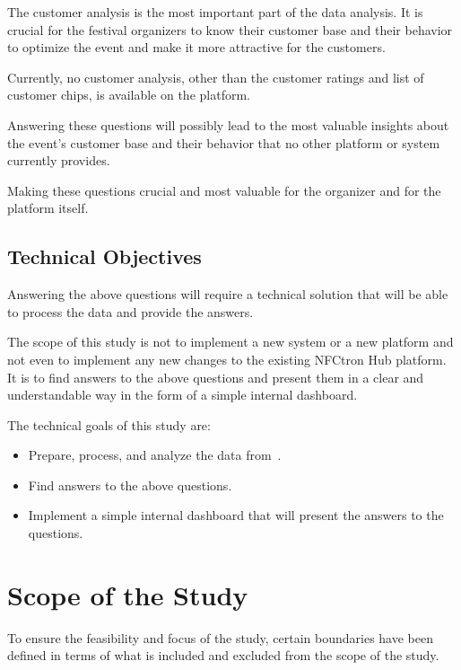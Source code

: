 The customer analysis is the most important part of the data analysis.
It is crucial for the festival organizers to know their customer base and their behavior to optimize the event and make it more attractive for the customers.

Currently, no customer analysis, other than the customer ratings and list of customer chips, is available on the platform.

Answering these questions will possibly lead to the most valuable insights about the event's customer base and their behavior that no other platform or system currently provides.

Making these questions crucial and most valuable for the organizer and for the platform itself.

\subsection*{Technical Objectives}
\label{subsec:introduction-objectives-technical}
Answering the above questions will require a technical solution that will be able to process the data and provide the answers.

The scope of this study is not to implement a new system or a new platform and not even to implement any new changes to the existing NFCtron Hub platform.
It is to find answers to the above questions and present them in a clear and understandable way in the form of a simple internal dashboard.

The technical goals of this study are:
\begin{itemize}
	\item Prepare, process, and analyze the data from~\theEvent.
	\item Find answers to the above questions.
	\item Implement a simple internal dashboard that will present the answers to the questions.
\end{itemize}

\section*{Scope of the Study}
\label{sec:introduction-scope}
To ensure the feasibility and focus of the study, certain boundaries have been defined in terms of what is included and excluded from the scope of the study.

